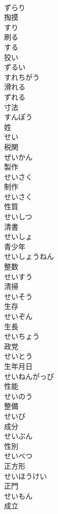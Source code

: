 \documentclass[8pt]{extreport}
\begin{document}
\begin{CJK}{UTF8}{min}
\\	ずらり	
\\	掏摸 
\\	すり	
\\	刷る 
\\	する	
\\	狡い 
\\	ずるい	
\\	すれちがう	
\\	滑れる 
\\	ずれる	
\\	寸法 
\\	すんぽう	
\\	姓 
\\	せい	
\\	税関 
\\	ぜいかん	
\\	製作 
\\	せいさく	
\\	制作 
\\	せいさく	
\\	性質 
\\	せいしつ	
\\	清書 
\\	せいしょ	
\\	青少年 
\\	せいしょうねん	
\\	整数 
\\	せいすう	
\\	清掃 
\\	せいそう	
\\	生存 
\\	せいぞん	
\\	生長 
\\	せいちょう	
\\	政党 
\\	せいとう	
\\	生年月日 
\\	せいねんがっぴ	
\\	性能 
\\	せいのう	
\\	整備 
\\	せいび	
\\	成分 
\\	せいぶん	
\\	性別 
\\	せいべつ	
\\	正方形 
\\	せいほうけい	
\\	正門 
\\	せいもん	
\\	成立 

\end{CJK}
\end{document}

